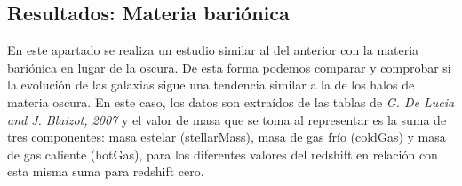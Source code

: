 \begin{comment}
La figura \textit{Figura}~\ref{fig:fig4} presenta el promedio de las masas de los halos para los cinco intervalos de masa de la \textit{Tabla}~\ref{tab:tabla2}. Esta gráfica, refleja un cambio portencual respecto al estado final a redshift cero. Por tanto, para un redhift dado se ve que un cierto halo ha ganado o perdido un cierto porcentaje de su masa final. Cabe esperar que para redshift cercanos al 0, su cambio porcentual sea muy pequeño, es decir, converja al estado final de manera suave. El halo ha llegado a una etapa estable y definida. Si ahora se implementa el concepto de desviación típica con muchos halos con los que promediar, ésta sera mínima para esta etapa final y máxima para el estado inicial. Esto se debe a que cada halo parte con comportamientos másicos muy distintos. Si se observa alguna desviación nula comprendida entre dos momentos de desviacin alta a redshift altos, esto se debe a que únicamente un halo con el que se ha promediado llega a ese redhisft. No quiere decir, por tanto, que todos los halos converjan en ese punto, si no que solo hay uno. \\

Es decir, se interpreta la desviación como la diferencia máxima entre un cambio porcentual de un halo respecto a otro para un redshift determinado. Conforme mayor sea la desviación, más distintos son los comportamientos. Los halos ganan o pierden masa de una manera más arbitraria. Si es materia negra, esto se debe a un intercambio por interacción gravitatoria. Ahota bien, si la desviación se reduce, los halos cambian de manera similar. Son más estables, tendrán menos interacciones. \\

De esta manera, se interpretan mejor las gráficas, resaltando la mala resolución que se produce en los halos de baja masa, cuya desviación es grande de manera continuada. 
\end{comment}

\subsection{Resultados: Materia bariónica}
\label{subsec:2_C}

En este apartado se realiza un estudio similar al del anterior con la materia bariónica en lugar de la oscura. De esta forma podemos comparar y comprobar si la evolución de las galaxias sigue una tendencia similar a la de los halos de materia oscura. En este caso, los datos son extraídos de las tablas de \textit{G. De Lucia and J. Blaizot, 2007} \cite{2} y el valor de masa que se toma al representar es la suma de tres componentes: masa estelar (stellarMass), masa de gas frío (coldGas) y masa de gas caliente (hotGas), para los diferentes valores del redshift en relación con esta misma suma para redshift cero.

